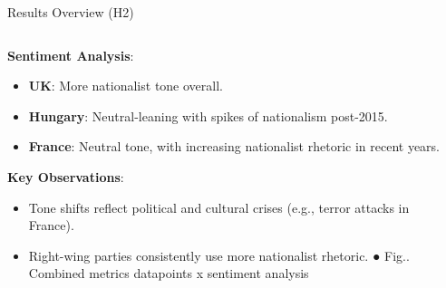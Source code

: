 \documentclass[8pt]{beamer}
\begin{document}
\begin{frame}{Results Overview (H2)}
        \begin{columns}[T] %
            \begin{column}{0.5\textwidth} %
            \textbf{Sentiment Analysis}:
    \begin{itemize}
        \item  \textbf{UK}: More nationalist tone overall.
        \item  \textbf{Hungary}: Neutral-leaning with spikes of nationalism post-2015.
        \item  \textbf{France}: Neutral tone, with increasing nationalist rhetoric in recent years.
    \end{itemize}
    
    \textbf{Key Observations}:
    \begin{itemize}
        \item Tone shifts reflect political and cultural crises (e.g., terror attacks in France).
        \item  Right-wing parties consistently use more nationalist rhetoric.
    ● Fig.. Combined metrics datapoints x sentiment analysis
    \end{itemize}
            \end{column}
            \begin{column}{0.5\textwidth} %
                \centering

\end{column}
\end{columns}
\end{frame}
\end{document}
